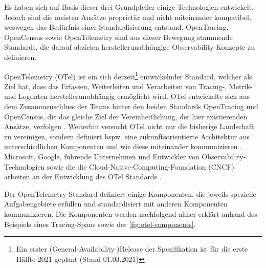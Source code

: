 
Es haben sich auf Basis dieser drei Grundpfeiler einige Technologien entwickelt. Jedoch sind die meisten Ansätze proprietär und nicht miteinander kompatibel, weswegen das Bedürfnis einer Standardisierung entstand. OpenTracing, OpenCensus \cite{OpenCensus} sowie OpenTelemetry \cite{OpenTelemetry} sind aus dieser Bewegung stammende Standards, die darauf abzielen herstellerunabhängige Observability-Konzepte zu definieren.

OpenTelemetry (OTel) ist ein sich derzeit\footnote{Ein erster (General-Availability-)Release der Spezifikation ist für die erste Hälfte 2021 geplant \cite{OpenTelemetryGARelease} (Stand 01.03.2021)} entwickelnder Standard, welcher als Ziel hat, dass das Erfassen, Weiterleiten und Verarbeiten von  Tracing-, Metrik- und Logdaten\footnotemark{} herstellerunabhängig ermöglicht wird. OTel entwickelte sich aus dem Zusammenschluss der Teams hinter den beiden Standards OpenTracing und OpenCensus, die das gleiche Ziel der Vereinheitlichung, der hier existierenden Ansätze, verfolgen  \cite{UseNixDistributiveTracing}. Weiterhin versucht OTel nicht nur die bisherige Landschaft zu vereinigen, sondern definiert bspw. eine zukunftsorientierte Architektur aus unterschiedlichen Komponenten und wie diese miteinander kommunizieren \cite{DistributedTracingInPractice}. Microsoft, Google, führende Unternehmen und Entwickler von Observability-Technologien sowie die die Cloud-Native-Computing-Foundation (CNCF) arbeiten an der Entwicklung des OTel Standards \cite{DistributedTracingInPractice} \cite{OpenTelemetryCommunityMembers}.


Der OpenTelemetry-Standard definiert einige Komponenten, die jeweils spezielle Aufgabengebiete erfüllen und standardisiert mit anderen Komponenten kommunizieren. Die Komponenten werden nachfolgend näher erklärt anhand des Beispiels eines Tracing-Spans sowie der \autoref{fig:otel-components}.

